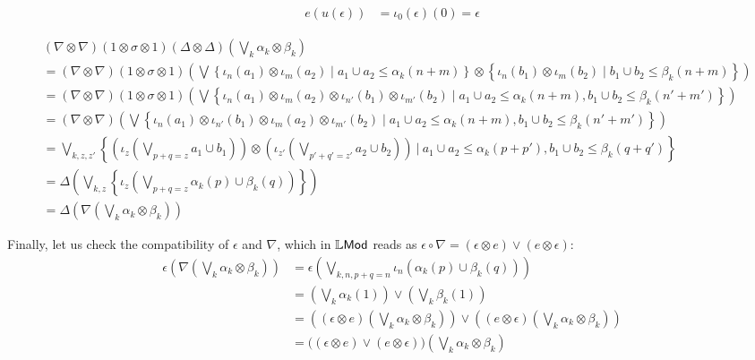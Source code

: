 \begin{itemize}
\begin{align*}
e(u(\epsilon))&= \iota_{0}(\epsilon)(0)= \epsilon
\end{align*}




{\tiny
\begin{align*}
&(\nabla\otimes \nabla)  (1\otimes \sigma\otimes 1)(\Delta\otimes \Delta)\left (\bigvee_{k}\alpha_{k}\otimes \beta_{k}\right) \\
&=
(\nabla\otimes \nabla)(1\otimes \sigma\otimes 1)
\left(
\bigvee
\left\{
 \iota_{n}(a_{1})\otimes \iota_{m}(a_{2})\mid
a_{1}\cup a_{2}\leq \alpha_{k}(n+m)
\right\}\otimes
\left\{
 \iota_{n}(b_{1})\otimes \iota_{m}(b_{2})\mid
b_{1}\cup b_{2}\leq \beta_{k}(n+m)
\right\}
\right)\\
&=
(\nabla\otimes \nabla)(1\otimes \sigma\otimes 1)
\left(
\bigvee
\left\{
 \iota_{n}(a_{1})\otimes \iota_{m}(a_{2})
\otimes \iota_{n'}(b_{1})\otimes \iota_{m'}(b_{2})
\mid
a_{1}\cup a_{2}\leq \alpha_{k}(n+m),
b_{1}\cup b_{2}\leq \beta_{k}(n'+m')
\right\}
\right)\\
&=
(\nabla\otimes \nabla)\left(
\bigvee
\left\{
 \iota_{n}(a_{1})\otimes \iota_{n'}(b_{1})
\otimes \iota_{m}(a_{2})\otimes \iota_{m'}(b_{2})
\mid
a_{1}\cup a_{2}\leq \alpha_{k}(n+m),
b_{1}\cup b_{2}\leq \beta_{k}(n'+m')
\right\}
\right)\\
&=
\bigvee_{k,z,z'}\left\{
\left(
\iota_{z}\left( \bigvee_{p+q=z}
a_{1}\cup b_{1}\right)\right)\otimes
\left(\iota_{z'}\left( \bigvee_{p'+q'=z'}
a_{2}\cup b_{2}\right)\right)
\ \Bigg \vert \
a_{1}\cup a_{2} \leq \alpha_{k}(p+p'),
b_{1}\cup b_{2}\leq \beta_{k}(q+q')
\right\}
\\
&=\Delta\left(
\bigvee_{k,z}
\left\{
\iota_{z}\left( \bigvee_{p+q=z} \alpha_{k}(p)\cup \beta_{k}(q) \right)
\right\}
\right)
\\
&=
\Delta\left (\nabla\left(\bigvee_{k}\alpha_{k}\otimes \beta_{k}\right) \right)
\end{align*}
}

Finally, let us check the compatibility of $\epsilon$ and $\nabla$, which in $\mathbb{L}\mathsf{Mod}$ reads as
$ \epsilon\circ \nabla=(\epsilon \otimes e)\vee (e\otimes \epsilon)$:
\begin{align*}
\epsilon \left(\nabla\left(\bigvee_{k}\alpha_{k}\otimes \beta_{k}\right)\right) & =
\epsilon\left (  \bigvee_{k,n,p+q=n}\iota_{n}(\alpha_{k}(p)\cup \beta_{k}(q))\right) \\
&=\left(\bigvee_{k}\alpha_{k}(1) \right) \vee \left(
\bigvee_{k}\beta_{k}(1)\right)
\\
&=
\left( (\epsilon\otimes e)\left(\bigvee_{k}\alpha_{k}\otimes \beta_{k}\right)
\right)
\vee
\left( (e\otimes \epsilon)\left(\bigvee_{k}\alpha_{k}\otimes \beta_{k}\right)
\right)
\\
&=
\Big((\epsilon\otimes e)\vee (e\otimes \epsilon)\Big)\left(\bigvee_{k}\alpha_{k}\otimes \beta_{k}\right)
 \end{align*}




\end{itemize}
